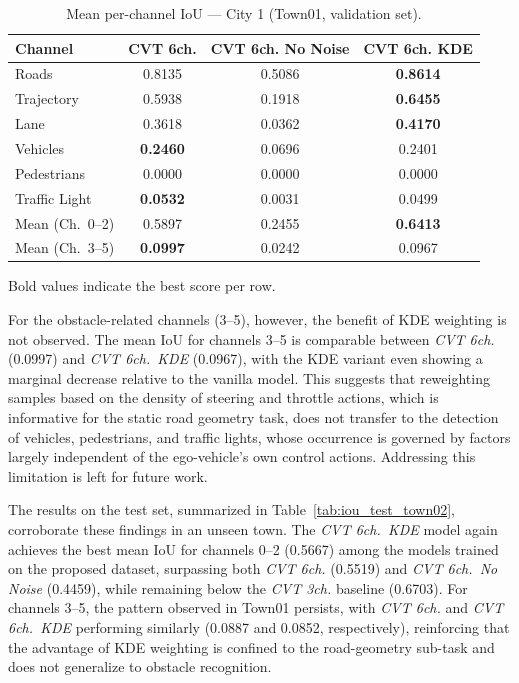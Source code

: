 \documentclass[12pt]{article}
\begin{document}
\begin{table}[ht]
\centering
\caption{Mean per-channel IoU — City 1 (Town01, validation set).}
\label{tab:iou_val_town01}
\begin{threeparttable}
\begin{tabular}{lccc}
\toprule
\textbf{Channel}
  & \textbf{CVT 6ch.}
  & \textbf{CVT 6ch. No Noise}
  & \textbf{CVT 6ch. KDE} \\
\midrule
Roads          & 0.8135 & 0.5086 & \textbf{0.8614} \\
Trajectory     & 0.5938 & 0.1918 & \textbf{0.6455} \\
Lane           & 0.3618 & 0.0362 & \textbf{0.4170} \\
Vehicles       & \textbf{0.2460} & 0.0696 & 0.2401 \\
Pedestrians    & 0.0000 & 0.0000 & 0.0000 \\
Traffic Light  & \textbf{0.0532} & 0.0031 & 0.0499 \\
\midrule
Mean (Ch.\ 0--2) & 0.5897 & 0.2455 & \textbf{0.6413} \\
Mean (Ch.\ 3--5) & \textbf{0.0997} & 0.0242 & 0.0967 \\
\bottomrule
\end{tabular}
\begin{tablenotes}
\small
\item Bold values indicate the best score per row.
\end{tablenotes}
\end{threeparttable}
\end{table}



For the obstacle-related channels (3--5), however, the benefit of KDE weighting is not observed. The mean IoU for channels 3--5 is comparable between \textit{CVT 6ch.} (0.0997) and \textit{CVT 6ch.\ KDE} (0.0967), with the KDE variant even showing a marginal decrease relative to the vanilla model. This suggests that reweighting samples based on the density of steering and throttle actions, which is informative for the static road geometry task, does not transfer to the detection of vehicles, pedestrians, and traffic lights, whose occurrence is governed by factors largely independent of the ego-vehicle's own control actions. Addressing this limitation is left for future work.


The results on the test set, summarized in Table~\ref{tab:iou_test_town02}, corroborate these findings in an unseen town. The \textit{CVT 6ch.\ KDE} model again achieves the best mean IoU for channels 0--2 (0.5667) among the models trained on the proposed dataset, surpassing both \textit{CVT 6ch.} (0.5519) and \textit{CVT 6ch.\ No Noise} (0.4459), while remaining below the \textit{CVT 3ch.} baseline (0.6703). For channels 3--5, the pattern observed in Town01 persists, with \textit{CVT 6ch.} and \textit{CVT 6ch.\ KDE} performing similarly (0.0887 and 0.0852, respectively), reinforcing that the advantage of KDE weighting is confined to the road-geometry sub-task and does not generalize to obstacle recognition. 
\end{document}
